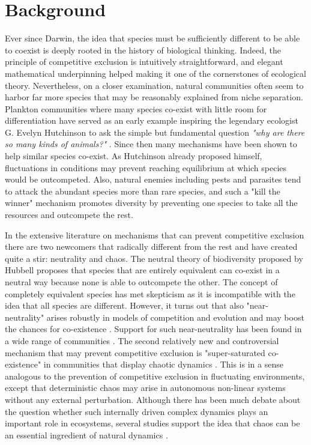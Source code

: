 \section{Background}
\label{sec:Background} 
Ever since Darwin, the idea that species must be sufficiently different to be able to coexist is deeply rooted in the history of biological thinking. Indeed, the principle of competitive exclusion is intuitively straightforward, and elegant mathematical underpinning\cite{MacArthur} helped making it one of the cornerstones of ecological theory. Nevertheless, on a closer examination, natural communities often seem to harbor far more species that may be reasonably explained from niche separation. Plankton communities where many species co-exist with little room for differentiation have served as an early example \cite{Hutchinson, Hutchinson1961} inspiring the legendary ecologist G. Evelyn Hutchinson to ask the simple but fundamental question \textit{"why are there so many kinds of animals?"} \cite{Hutchinson1961}. Since then many mechanisms have been shown to help similar species co-exist. As Hutchinson already proposed himself, fluctuations in conditions may prevent reaching equilibrium at which species would be outcompeted. Also, natural enemies including pests and parasites tend to attack the abundant species more than rare species, and such a "kill the winner"\cite{Winter2010} mechanism promotes diversity by preventing one species to take all the resources and outcompete the rest.

In the extensive literature on mechanisms that can prevent competitive exclusion there are two newcomers that radically different from the rest and have created quite a stir: neutrality and chaos. The neutral theory of biodiversity proposed by Hubbell \cite{Hubbell2001} proposes that species that are entirely equivalent can co-exist in a neutral way because none is able to outcompete the other. The concept of completely equivalent species has met skepticism as it is incompatible with the idea that all species are different. However, it turns out that also "near-neutrality" arises robustly in models of competition and evolution and may boost the chances for co-existence \cite{Scheffer2006, Scheffer2018, Fort2009, Fort2010}. Support for such near-neutrality has been found in a wide range of communities \cite{Scheffer2006, Vergnon2013, Scheffera, Segura2013, Vergnon2012}. The second relatively new and controversial mechanism that may prevent competitive exclusion is "super-saturated co-existence" in communities that display chaotic dynamics \cite{Huisman1999}. This is in a sense analogous to the prevention of competitive exclusion in fluctuating environments, except that deterministic chaos may arise in autonomous non-linear systems without any external perturbation. Although there has been much debate about the question whether such internally driven complex dynamics plays an important role in ecosystems, several studies support the idea that chaos can be an essential ingredient of natural dynamics \cite{Beninca2008}.

